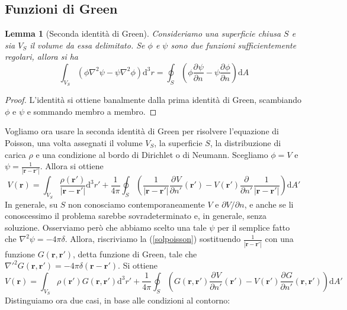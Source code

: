 \documentclass[a4paper,11pt]{book}
\newcommand{\dif}{\mathrm{d}}
\newcommand{\der}[3][]{\frac{\partial ^{#1}#2}{\partial {#3}^{#1}}}
\let\oldnabla\nabla
\renewcommand{\nabla}{\vec{\oldnabla}}
\newcommand{\lap}{\oldnabla^2}
\renewcommand{\vec}[1]{\mathbf{#1}}
\theoremstyle{theorem}
\newtheorem{lemma}{Lemma}[section]
\theoremstyle{definition}
\begin{document}
\subsection{Funzioni di Green}
\begin{lemma}[Seconda identità di Green]
	Consideriamo una superficie chiusa $S$ e sia $V_S$ il volume da essa delimitato. Se $\phi$ e $\psi$ sono due funzioni sufficientemente regolari, allora si ha
	\[\int_{V_S}\left(\phi\lap\psi-\psi\lap\phi\right)\dif^3r=\oint_S\left(\phi\der{\psi}{n}-\psi\der{\phi}{n}\right)\dif A\]
\end{lemma}
\begin{proof}
	L'identità si ottiene banalmente dalla prima identità di Green, scambiando $\phi$ e $\psi$ e sommando membro a membro.
\end{proof}
Vogliamo ora usare la seconda identità di Green per risolvere l'equazione di Poisson, una volta assegnati il volume $V_S$, la superficie $S$, la distribuzione di carica $\rho$ e una condizione al bordo di Dirichlet o di Neumann. Scegliamo $\phi=V$ e $\psi=\frac{1}{|\vec{r}-\vec{r}'|}$. Allora si ottiene
\begin{equation}
\label{solpoisson}
	V(\vec{r})=\int_{V_S}\frac{\rho(\vec{r}')}{|\vec{r}-\vec{r}'|}\dif^3r'+\frac{1}{4\pi}\oint_S\left(\frac{1}{|\vec{r}-\vec{r}'|}\der{V}{n'}(\vec{r}')-V(\vec{r}')\der{}{n'}\frac{1}{|\vec{r}-\vec{r}'|}\right)\dif A'
\end{equation}
In generale, su $S$ non conosciamo contemporaneamente $V$ e $\partial V/\partial n$, e anche se li conoscessimo il problema sarebbe sovradeterminato e, in generale, senza soluzione. Osserviamo però che abbiamo scelto una tale $\psi$ per il semplice fatto che $\lap\psi=-4\pi\delta$. Allora, riscriviamo la (\ref{solpoisson}) sostituendo $\frac{1}{|\vec{r}-\vec{r}'|}$ con una funzione $G(\vec{r},\vec{r}')$, detta funzione di Green, tale che $\oldnabla'^2G(\vec{r},\vec{r}')=-4\pi\delta(\vec{r}-\vec{r}')$. Si ottiene
\[
	V(\vec{r})=\int_{V_S}\rho(\vec{r}')G(\vec{r},\vec{r}')\dif^3r'+\frac{1}{4\pi}\oint_S\left(G(\vec{r},\vec{r}')\der{V}{n'}(\vec{r}')-V(\vec{r}')\der{G}{n'}(\vec{r},\vec{r}')\right)\dif A'
\]
Distinguiamo ora due casi, in base alle condizioni al contorno:
\end{document}
